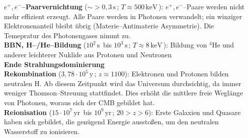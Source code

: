 \documentclass[a4paper,12pt]{article}
\numberwithin{equation}{section}
\begin{document}
\textbf{$e^+,e^-$--Paarvernichtung} ($\sim >0,3\,\text{s}\,$; $T\approx 500\,\text{keV}\,$): $e^+,e^-$--Paare werden nicht mehr effizient erzeugt. Alle Paare werden in Photonen verwandelt; ein winziger Elektronenanteil bleibt übrig (Materie--Antimaterie Asymmetrie). Die Temepratur des Photonengases nimmt zu.\\
\textbf{BBN, H--/He--Bildung} ($10^2\,\text{s}\,$ bis $10^3\,\text{s}\,$; $T\approx 8\,\text{keV}\,$): Bildung von $^4$He und anderer leichterer Nuklide aus Protonen und Neutronen\\
\textbf{Ende Strahlungsdominierung}\\
\textbf{Rekombination} ($3,78\cdot 10^{5}\,\text{y}\,$; $z\approx 1100$): Elektronen und Protonen bilden neutralen H. Ab diesem Zeitpunkt wird das Universum durchsichtig, da immer weniger Thomson--Streuung stattfindet. Dies erhöht die mittlere freie Weglänge von Photonen, woraus sich der CMB gebildet hat.\\
\textbf{Reionisation} ($15\cdot 10^7\,\text{yr}\,$ bis $10^9\,\text{yr}\,$; $20>z>6$): Erste Galaxien und Quasare haben sich gebildet, die genügend Energie ausstoßen, um den neutralen Wasserstoff zu ionisieren.


\end{document}
